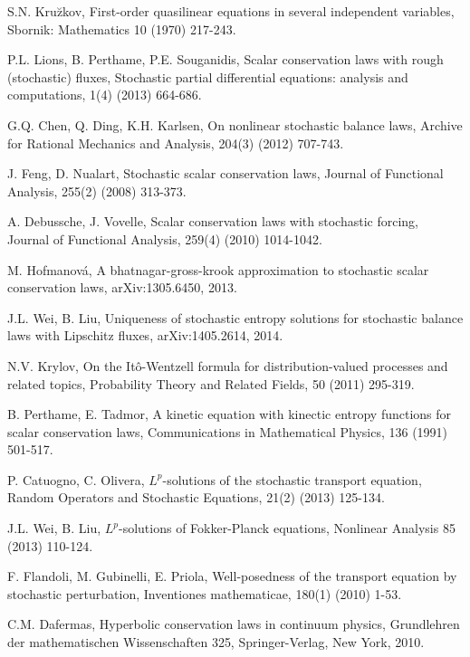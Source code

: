 \documentclass[11pt]{article}
\begin{document}
\begin{thebibliography}{00}
  S.N. Kru\u{z}kov, First-order quasilinear equations in several
independent variables, Sbornik: Mathematics 10 (1970) 217-243.

  P.L. Lions, B. Perthame, P.E. Souganidis, Scalar conservation laws
with rough (stochastic) fluxes, Stochastic partial differential
equations: analysis and computations, 1(4) (2013) 664-686.

  G.Q. Chen, Q. Ding, K.H. Karlsen, On nonlinear stochastic balance
laws, Archive for Rational Mechanics and Analysis, 204(3) (2012)
707-743.

  J. Feng, D. Nualart, Stochastic scalar conservation laws, Journal
of Functional Analysis, 255(2) (2008) 313-373.

 A. Debussche, J. Vovelle, Scalar conservation laws with stochastic
forcing, Journal of Functional Analysis,  259(4) (2010) 1014-1042.

 M. Hofmanov\'{a}, A bhatnagar-gross-krook approximation to
stochastic scalar conservation laws, arXiv:1305.6450, 2013.

 J.L. Wei, B. Liu,  Uniqueness of stochastic entropy solutions for stochastic balance
laws with Lipschitz fluxes, arXiv:1405.2614, 2014.

 N.V. Krylov, On the It\^{o}-Wentzell formula for distribution-valued
processes and related topics, Probability Theory and Related Fields,
50 (2011) 295-319.

 B. Perthame, E. Tadmor, A kinetic equation with kinectic entropy
functions for scalar conservation laws, Communications in
Mathematical Physics, 136 (1991) 501-517.

 P. Catuogno, C. Olivera, $L^p$-solutions of the stochastic transport
equation,  Random Operators and Stochastic Equations, 21(2) (2013)
125-134.

 J.L. Wei, B. Liu, $L^p$-solutions of Fokker-Planck equations,
Nonlinear Analysis 85 (2013) 110-124.

 F. Flandoli, M. Gubinelli, E. Priola,  Well-posedness of the transport
equation by stochastic perturbation, Inventiones mathematicae,
180(1) (2010) 1-53.

 C.M. Dafermas, Hyperbolic conservation laws in continuum physics,
Grundlehren der mathematischen Wissenschaften 325,  Springer-Verlag,
New York, 2010.
\end{thebibliography}
\end{document}
